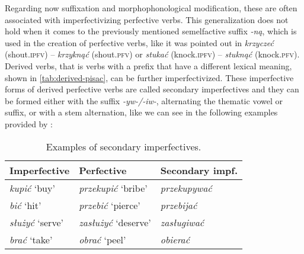 \documentclass[12pt]{article}
\begin{document}
Regarding now suffixation and morphophonological modification, these are often associated with imperfectivizing perfective verbs. This generalization does not hold when it comes to the previously mentioned semelfactive suffix \textit{-ną}, which is used in the creation of perfective verbs, like it was pointed out in \textit{krzyczeć} (shout.\textsc{ipfv}) -- \textit{krzyknąć} (shout.\textsc{pfv}) or \textit{stukać} (knock.\textsc{ipfv}) -- \textit{stuknąć} (knock.\textsc{pfv}). Derived verbs, that is verbs with a prefix that have a different lexical meaning, shown in \autoref{tab:derived-pisac}, can be further imperfectivized. These imperfective forms of derived perfective verbs are called secondary imperfectives and they can be formed either with the suffix \textit{-yw-/-i\textit{w}-}, alternating the thematic vowel or suffix, or with a stem alternation, like we can see in the following examples provided by \textcite{willim2006EventIndividuationCountability}:

 \begin{table}[h!]
    \centering
    \small
    \begin{tabular}{p{2.5cm}p{3cm}l}
        \toprule
        \textbf{Imperfective} & \textbf{Perfective} & \textbf{Secondary impf.} \\ 
        \midrule
        \textit{kupić} `buy' & \textit{przekupić} `bribe'	& \textit{przekupywać}  \\
        \textit{bić} `hit' & \textit{przebić} `pierce'	& \textit{przebijać} 	 \\
        \textit{służyć} `serve' & \textit{zasłużyć} `deserve'  & \textit{zasługiwać}	 \\
        \textit{brać} `take' & \textit{obrać}	`peel' & \textit{obierać}  \\
        \bottomrule
    \end{tabular}
    \caption{Examples of secondary imperfectives.}
    \label{tab:simpf}
\end{table}
\end{document}
